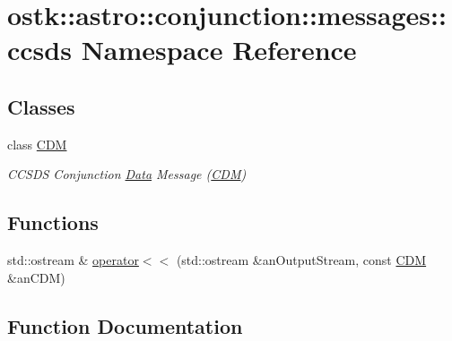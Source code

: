 \hypertarget{namespaceostk_1_1astro_1_1conjunction_1_1messages_1_1ccsds}{}\section{ostk\+:\+:astro\+:\+:conjunction\+:\+:messages\+:\+:ccsds Namespace Reference}
\label{namespaceostk_1_1astro_1_1conjunction_1_1messages_1_1ccsds}
\subsection*{Classes}
\begin{DoxyCompactItemize}
\item 
class \hyperlink{classostk_1_1astro_1_1conjunction_1_1messages_1_1ccsds_1_1_c_d_m}{C\+DM}
\begin{DoxyCompactList}\small\item\em C\+C\+S\+DS Conjunction \hyperlink{structostk_1_1astro_1_1conjunction_1_1messages_1_1ccsds_1_1_c_d_m_1_1_data}{Data} Message (\hyperlink{classostk_1_1astro_1_1conjunction_1_1messages_1_1ccsds_1_1_c_d_m}{C\+DM}) \end{DoxyCompactList}\end{DoxyCompactItemize}
\subsection*{Functions}
\begin{DoxyCompactItemize}
\item 
std\+::ostream \& \hyperlink{namespaceostk_1_1astro_1_1conjunction_1_1messages_1_1ccsds_af3cc298db2414efc981d6b401742997a}{operator$<$$<$} (std\+::ostream \&an\+Output\+Stream, const \hyperlink{classostk_1_1astro_1_1conjunction_1_1messages_1_1ccsds_1_1_c_d_m}{C\+DM} \&an\+C\+DM)
\end{DoxyCompactItemize}


\subsection{Function Documentation}
\mbox{\label{namespaceostk_1_1astro_1_1conjunction_1_1messages_1_1ccsds_af3cc298db2414efc981d6b401742997a}} 
